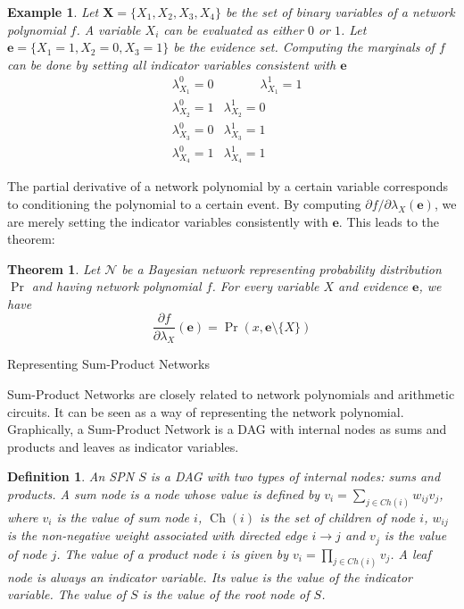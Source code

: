 \documentclass{amsart}
\makeatletter
\def\subsection{\@startsection{subsection}{3}%
  \z@{.5\linespacing\@plus.7\linespacing}{.1\linespacing}%
  {\normalfont\itshape}}
\DeclareMathOperator*{\Ch}{\text{Ch}}
\theoremstyle{plain}
\newcounter{dummy-def}\numberwithin{dummy-def}{section}
\newtheorem{definition}[dummy-def]{Definition}
\newcounter{dummy-thm}\numberwithin{dummy-thm}{section}
\newtheorem{theorem}[dummy-thm]{Theorem}
\newcounter{dummy-prop}\numberwithin{dummy-prop}{section}
\newcounter{dummy-corollary}\numberwithin{dummy-corollary}{section}
\newcounter{dummy-ex}\numberwithin{dummy-ex}{section}
\newcounter{dummy-eg}\numberwithin{dummy-eg}{section}
\newtheorem{example}[dummy-eg]{Example}
\numberwithin{equation}{section}
\makeatother
\begin{document}
\begin{example}
  Let $\mathbf{X}=\{X_1,X_2,X_3,X_4\}$ be the set of binary variables of a network polynomial $f$.
  A variable $X_i$ can be evaluated as either $0$ or $1$. Let $\mathbf{e}=\{X_1=1,X_2=0,X_3=1\}$ be
  the evidence set. Computing the marginals of $f$ can be done by setting all indicator variables
  consistent with $\mathbf{e}$\\
  \begin{align*}
    &\lambda_{X_1}^0=0 &\hspace{35pt} \lambda_{X_1}^1=1\\
    &\lambda_{X_2}^0=1 & \lambda_{X_2}^1=0\\
    &\lambda_{X_3}^0=0 & \lambda_{X_3}^1=1\\
    &\lambda_{X_4}^0=1 & \lambda_{X_4}^1=1
  \end{align*}
\end{example}

The partial derivative of a network polynomial by a certain variable corresponds to conditioning
the polynomial to a certain event. By computing $\partial f/\partial \lambda_X(\mathbf{e})$, we are
merely setting the indicator variables consistently with $\mathbf{e}$. This leads to the theorem:

\begin{theorem} Let $\mathcal{N}$ be a Bayesian network representing probability distribution $\Pr$
  and having network polynomial $f$. For every variable $X$ and evidence $\mathbf{e}$, we have
  \begin{equation*}
    \frac{\partial f}{\partial \lambda_X}(\mathbf{e})=\Pr(x,\mathbf{e}\setminus\{X\})
  \end{equation*}
\end{theorem}

\subsection{Representing Sum-Product Networks}

Sum-Product Networks are closely related to network polynomials and arithmetic circuits. It can be
seen as a way of representing the network polynomial. Graphically, a Sum-Product Network is a DAG
with internal nodes as sums and products and leaves as indicator variables.

\begin{definition}
  An SPN $S$ is a DAG with two types of internal nodes: sums and products. A sum node is a node
  whose value is defined by $v_i=\sum_{j \in Ch(i)} w_{ij}v_j$, where $v_i$ is the value of sum
  node $i$, $\Ch(i)$ is the set of children of node $i$, $w_{ij}$ is the non-negative weight
  associated with directed edge $i\to j$ and $v_j$ is the value of node $j$. The value of a product
  node $i$ is given by $v_i=\prod_{j\in Ch(i)} v_j$. A leaf node is always an indicator variable.
  Its value is the value of the indicator variable. The value of $S$ is the value of the root node
  of $S$.
\end{definition}
\end{document}

